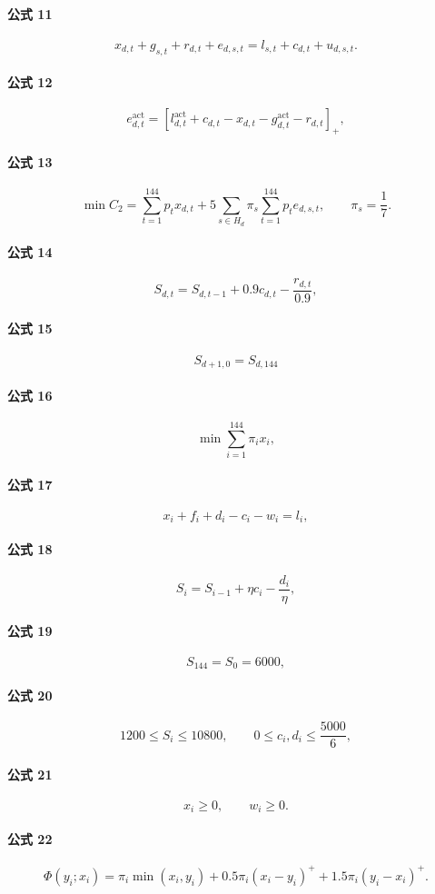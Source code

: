 \documentclass[12pt]{article}
\begin{document}
\paragraph{公式 11}
\[
x_{d,t}+g_{s,t}+r_{d,t}+e_{d,s,t}
=l_{s,t}+c_{d,t}+u_{d,s,t}.
\]
\paragraph{公式 12}
\[
e^{\mathrm{act}}_{d,t}
=\left[l^{\mathrm{act}}_{d,t}+c_{d,t}-x_{d,t}-g^{\mathrm{act}}_{d,t}-r_{d,t}\right]_+,
\]
\paragraph{公式 13}
\[
\min C_2=
\sum_{t=1}^{144}p_t x_{d,t}
+5\sum_{s\in H_d}\pi_s\sum_{t=1}^{144}p_t e_{d,s,t},
\qquad \pi_s=\frac17.
\]
\paragraph{公式 14}
\[
S_{d,t}=S_{d,t-1}+0.9c_{d,t}-\frac{r_{d,t}}{0.9},
\]
\paragraph{公式 15}
\[
S_{d+1,0}=S_{d,144}
\]
\paragraph{公式 16}
\[
\min\sum_{i=1}^{144}\pi_i x_i,
\]
\paragraph{公式 17}
\[
x_i+f_i+d_i-c_i-w_i=l_i,
\]
\paragraph{公式 18}
\[
S_i=S_{i-1}+\eta c_i-\frac{d_i}{\eta},
\]
\paragraph{公式 19}
\[
S_{144}=S_0=6000,
\]
\paragraph{公式 20}
\[
1200\le S_i\le10800,\qquad 0\le c_i,d_i\le\frac{5000}{6},
\]
\paragraph{公式 21}
\[
x_i\ge0,\qquad w_i\ge0.
\]
\paragraph{公式 22}
\[
\Phi(y_i;x_i)=\pi_i\min(x_i,y_i)
+0.5\pi_i(x_i-y_i)^+
+1.5\pi_i(y_i-x_i)^+.
\]
\end{document}
